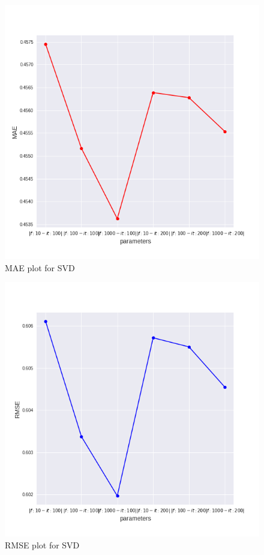 \documentclass[letterpaper, 10 pt, conference]{ieeeconf}  %
\begin{document}
\begin{figure}[h]
            \includegraphics[scale=0.4]{MAE_SVD.png}
            \centering
            \caption{MAE plot for SVD}
            \label{fig:MAE_SVD}
        \end{figure}
 \begin{figure}[h]
            \includegraphics[scale=0.4]{RMSE_SVD.png}
            \centering
            \caption{RMSE plot for SVD}
            \label{fig:RMSE_SVD}
        \end{figure}
\end{document}
